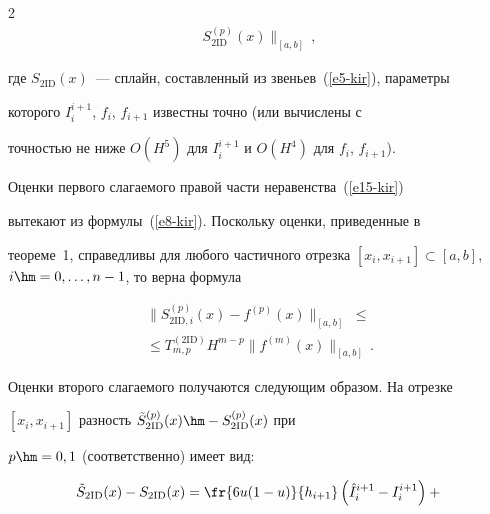 \begin{multicols}{2}
\begin{multline}
S_{2\mathrm{ID}}^{(p)}(x)\!\parallel_{[a,b]}\,,


  \label{e15-kir}


  \end{multline}


где $S_{2\mathrm{ID}}(x)$~--- сплайн, составленный из звеньев~(\ref{e5-kir}), параметры 


которого $I_i^{i+1}$, $f_i$, $f_{i+1}$ известны точно (или вычислены с 


точностью не ниже $O(H^5)$ для $I_i^{i+1}$ и $O(H^4)$ для $f_i$, $f_{i+1}$).





  Оценки первого слагаемого правой части неравенства~(\ref{e15-kir}) 


вытекают из формулы~(\ref{e8-kir}). Поскольку оценки, приведенные в 


теореме~1, справедливы для любого частичного отрезка $[x_i,x_{i+1}]\subset 


[a,b]$, $i\hm=0,\ldots , n-1$, то верна формула


  \begin{multline}


  \parallel\! S^{(p)}_{2\mathrm{ID},i}(x) -f^{(p)}(x)\!\parallel_{[a,b]} \;\leq {}\\


  {}\leq T^{(2\mathrm{ID})}_{m,p} 


H^{m-p}\parallel\! f^{(m)}(x)\!\parallel_{[a,b]}\,.


  \label{e16-kir}


  \end{multline}


  


  Оценки второго слагаемого получаются следующим образом. На отрезке 


$[x_i,x_{i+1}]$ разность $\tilde{S}^{(p)}_{2\mathrm{ID}}(x)\hm- S_{2\mathrm{ID}}^{(p)}(x)$ при 


$p\hm=0,1$ (соответственно) имеет вид:





\noindent 


  \begin{multline}


  \tilde{S}_{2\mathrm{ID}}(x) -S_{2\mathrm{ID}}(x) = \fr{6u(1-u)}{h_{i+1}}\left( \hat{I}_i^{i+1} -


I_i^{i+1}\right) +{}\\



\end{multline}
\end{multicols}
